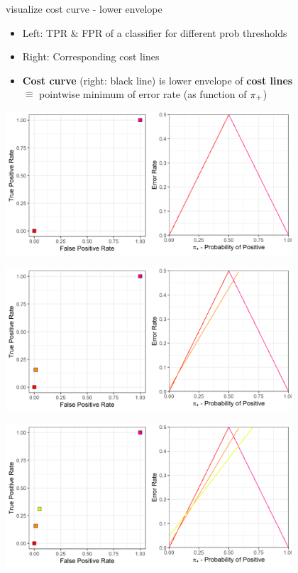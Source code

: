 \documentclass[11pt,compress,t,notes=noshow, xcolor=table]{beamer}
\begin{document}
\begin{frame}{visualize cost curve - lower envelope}

	\begin{itemize}
	  \item<1-> Left: TPR $\&$ FPR of a classifier for different prob thresholds
	  \item<1-> Right: Corresponding cost lines
		\item<4-> \textbf{Cost curve} (right: black line) is lower envelope of \textbf{cost lines} \\
		$\hat{=}$ pointwise minimum of error rate (as function of $\pi_{+}$)
	\end{itemize}
   {
    \begin{center}
      \includegraphics[width=0.8\textwidth]{figure/lower_envelope_1.png}
    \end{center}
  }
   {
    \begin{center}
      \includegraphics[width=0.8\textwidth]{figure/lower_envelope_2.png}
    \end{center}
  }
   {
    \begin{center}
      \includegraphics[width=0.8\textwidth]{figure/lower_envelope_3.png}

\end{center}}
\end{frame}
\end{document}
